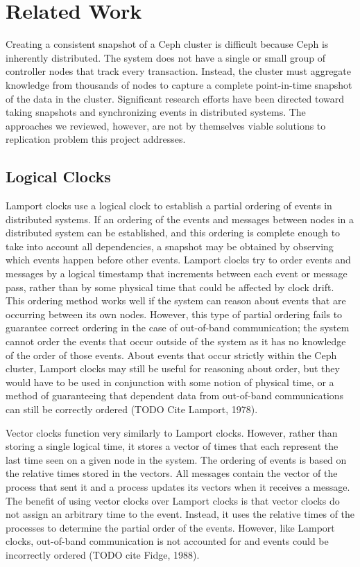 \chapter{Related Work}
\label{sec:rel-work}

Creating a consistent snapshot of a Ceph cluster is difficult because
Ceph is inherently distributed. The system does not have a single or
small group of controller nodes that track every transaction. Instead,
the cluster must aggregate knowledge from thousands of nodes to
capture a complete point-in-time snapshot of the data in the
cluster. Significant research efforts have been directed toward taking
snapshots and synchronizing events in distributed systems. The
approaches we reviewed, however, are not by themselves viable
solutions to replication problem this project addresses.

\section{Logical Clocks}

Lamport clocks use a logical clock to establish a partial ordering of
events in distributed systems. If an ordering of the events and
messages between nodes in a distributed system can be established, and
this ordering is complete enough to take into account all
dependencies, a snapshot may be obtained by observing which events
happen before other events. Lamport clocks try to order events and
messages by a logical timestamp that increments between each event or
message pass, rather than by some physical time that could be affected
by clock drift. This ordering method works well if the system can
reason about events that are occurring between its own nodes. However,
this type of partial ordering fails to guarantee correct ordering in
the case of out-of-band communication; the system cannot order the
events that occur outside of the system as it has no knowledge of the
order of those events. About events that occur strictly within the
Ceph cluster, Lamport clocks may still be useful for reasoning about
order, but they would have to be used in conjunction with some notion
of physical time, or a method of guaranteeing that dependent data from
out-of-band communications can still be correctly ordered (TODO Cite
Lamport, 1978).

Vector clocks function very similarly to Lamport clocks. However,
rather than storing a single logical time, it stores a vector of times
that each represent the last time seen on a given node in the
system. The ordering of events is based on the relative times stored
in the vectors. All messages contain the vector of the process that
sent it and a process updates its vectors when it receives a
message. The benefit of using vector clocks over Lamport clocks is
that vector clocks do not assign an arbitrary time to the
event. Instead, it uses the relative times of the processes to
determine the partial order of the events. However, like Lamport
clocks, out-of-band communication is not accounted for and events
could be incorrectly ordered (TODO cite Fidge, 1988).

